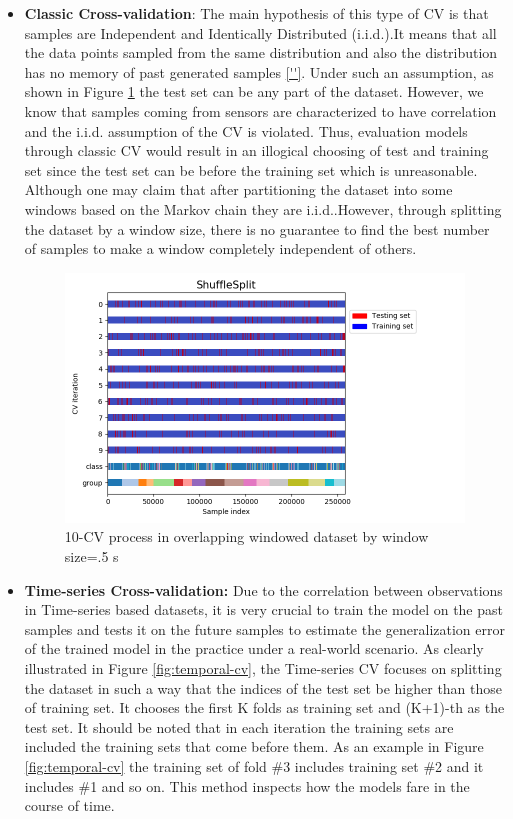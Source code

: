 \begin{itemize}
\item \textbf{Classic Cross-validation}: The main hypothesis of this type of CV is that samples are Independent and Identically Distributed (i.i.d.).It means that all the data points sampled from the same distribution and also the distribution has no memory of past generated samples \ref{''}. Under such an assumption, as shown in Figure \ref{fig:iid-cv} the test set can be any part of the dataset. However, we know that samples coming from sensors are characterized to have correlation and the i.i.d. assumption of the CV is violated. Thus, evaluation models through classic CV would result in an illogical choosing of test and training set since the test set can be before the training set which is unreasonable. Although one may claim that after partitioning the dataset into some windows based on the Markov chain \cite{gilks1995markov} they are i.i.d..However, through splitting the dataset by a window size, there is no guarantee to find the best number of samples to make a window completely independent of others. 

\begin{figure}[h]
    \centering
    \includegraphics[width=.5\textwidth]{Figures/ShuffleSplit.png}
    \caption{10-CV process in overlapping windowed dataset by window size=.5 s }
    \label{fig:iid-cv}
\end{figure}


\item \textbf{Time-series Cross-validation:}
Due to the correlation between observations in Time-series based datasets, it is very crucial to train the model on the past samples and tests it on the future samples to estimate the generalization error of the trained model in the practice under a real-world scenario. As clearly illustrated in Figure \ref{fig:temporal-cv}, the Time-series CV focuses on splitting the dataset in such a way that the indices of the test set be higher than those of training set. It chooses the first K folds as training set and (K+1)-th as the test set. It should be noted that in each iteration the training sets are included the training sets that come before them. As an example in Figure \ref{fig:temporal-cv} the training set of fold \#3 includes training set \#2 and it includes \#1 and so on.
This method inspects how the models fare in the course of time.



\end{itemize}
